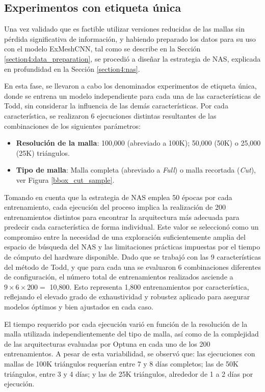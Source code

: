 \subsection{Experimentos con etiqueta única}
\label{unique_tag_exps}
Una vez validado que es factible utilizar versiones reducidas de las mallas sin pérdida significativa de información, y habiendo preparado los datos para su uso con el modelo ExMeshCNN, tal como se describe en la Sección \ref{section4:data_preparation}, se procedió a diseñar la estrategia de NAS, explicada en profundidad en la Sección \ref{section4:nas}.

En esta fase, se llevaron a cabo los denominados experimentos de etiqueta única, donde se entrena un modelo independiente para cada una de las características de Todd, sin considerar la influencia de las demás características. Por cada característica, se realizaron 6 ejecuciones distintas resultantes de las combinaciones de los siguientes parámetros:

\begin{itemize}
\item \textbf{Resolución de la malla}: 100,000 (abreviado a 100K); 50,000 (50K) o 25,000 (25K) triángulos.
\item \textbf{Tipo de malla}: Malla completa (abreviado a \textit{Full}) o malla recortada (\textit{Cut}), ver Figura \ref{bbox_cut_sample}.
\end{itemize}

Tomando en cuenta que la estrategia de NAS emplea 50 épocas por cada entrenamiento, cada ejecución del proceso implica la realización de 200 entrenamientos distintos para encontrar la arquitectura más adecuada para predecir cada característica de forma individual. Este valor se seleccionó como un compromiso entre la necesidad de una exploración suficientemente amplia del espacio de búsqueda del NAS y las limitaciones prácticas impuestas por el tiempo de cómputo del hardware disponible. Dado que se trabajó con las 9 características del método de Todd, y que para cada una se evaluaron 6 combinaciones diferentes de configuración, el número total de entrenamientos realizados asciende a $9 \times 6 \times 200 =$ 10,800. Esto representa 1,800 entrenamientos por característica, reflejando el elevado grado de exhaustividad y robustez aplicado para asegurar modelos óptimos y bien ajustados en cada caso.

El tiempo requerido por cada ejecución varió en función de la resolución de la malla utilizada independientemente del tipo de malla, así como de la complejidad de las arquitecturas evaluadas por Optuna en cada uno de los 200 entrenamientos. A pesar de esta variabilidad, se observó que: las ejecuciones con mallas de 100K triángulos requerían entre 7 y 8 días completos; las de 50K triángulos, entre 3 y 4 días; y las de 25K triángulos, alrededor de 1 a 2 días por ejecución.

